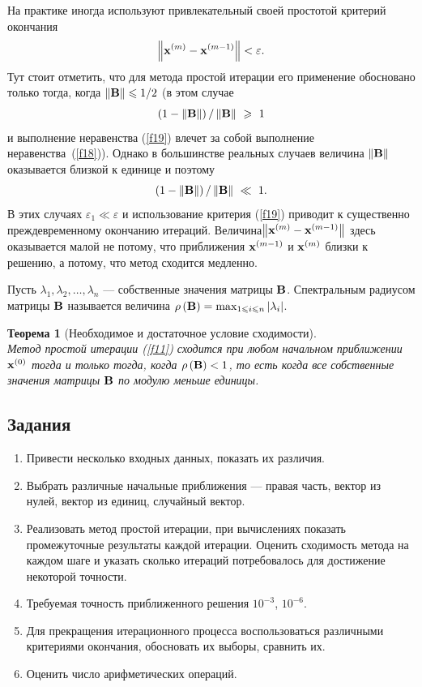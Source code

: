 \documentclass[12pt]{article}
\newtheorem{theorem}{Теорема}
\begin{document}
	На практике иногда используют привлекательный своей простотой критерий окончания
	\begin{equation}
		\left\|\bold{x}^{\left(m\right)}-\bold{x}^{\left(m-1\right)}\right\|<\varepsilon\label{f19}.
	\end{equation}
	Тут стоит отметить, что для метода простой итерации его применение обосновано только тогда, когда $\left\|\bold{B}\right\|\leqslant 1/2$ (в этом случае $$\left(1-\left\|\bold{B}\right\|\right)/\left\|\bold{B}\right\|~\geqslant~1$$
	и выполнение неравенства (\ref{f19}) влечет за собой выполнение неравенства~(\ref{f18})). Однако в большинстве реальных случаев величина $\left\|\bold{B}\right\|$ оказывается близкой к единице и поэтому $$\left(1-\left\|\bold{B}\right\|\right)/\left\|\bold{B}\right\|~\ll~1.$$
	В этих случаях $\varepsilon_1\ll\varepsilon$ и использование критерия (\ref{f19}) приводит к существенно преждевременному окончанию итераций. Величина\linebreak $\left\|\bold{x}^{\left(m\right)}-\bold{x}^{\left(m-1\right)}\right\|$ здесь оказывается малой не потому, что приближения $\bold{x}^{\left(m-1\right)}$ и $\bold{x}^{\left(m\right)}$ близки к решению, а потому, что метод сходится медленно.
	
	Пусть $\lambda_1, \lambda_2,\ldots,\lambda_n$ --- собственные значения матрицы $\bold{B}$. Спектральным радиусом матрицы $\bold{B}$ называется величина $\rho\left(\bold{B}\right)=\max_{1\leqslant i\leqslant n}|\lambda_i|$.
	\begin{theorem}[Необходимое и достаточное условие сходимости]
		\,\\Метод простой итерации (\ref{f11}) сходится при любом начальном приближении $\bold{x}^{\left(0\right)}$ тогда и только тогда, когда $\rho\left(\bold{B}\right)<1$, то есть когда все собственные значения матрицы $\bold{B}$ по модулю меньше единицы.
	\end{theorem}
	
	\subsection*{Задания}
	
	\begin{enumerate}
		\item Привести несколько входных данных, показать их различия.
		\item Выбрать различные начальные приближения --- правая часть, вектор из нулей, вектор из единиц, случайный вектор.
		\item Реализовать метод простой итерации, при вычислениях показать промежуточные результаты каждой итерации. Оценить сходимость метода на каждом шаге и указать сколько итераций потребовалось для достижение некоторой точности.
		\item Требуемая точность приближенного решения $10^{-3}$, $10^{-6}$.
		\item Для прекращения итерационного процесса воспользоваться различными критериями окончания, обосновать их выборы, сравнить их.
		\item Оценить число арифметических операций.
	\end{enumerate}
	
\end{document}
